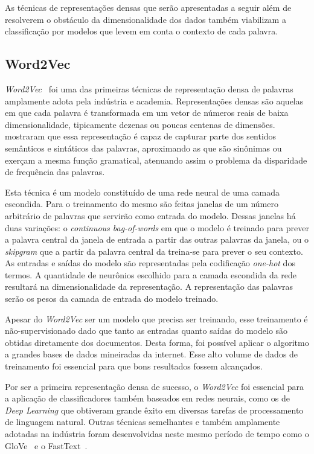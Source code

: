 
As técnicas de representações densas que serão apresentadas a seguir além de
resolverem o obstáculo da dimensionalidade dos dados também viabilizam a
classificação por modelos que levem em conta o contexto de cada palavra.

\subsection{Word2Vec}

\textit{Word2Vec}~\cite{mikolov13} foi uma das primeiras técnicas de
representação densa de palavras amplamente adota pela indústria e academia.
Representações densas são aquelas em que cada palavra é transformada em um vetor
de números reais de baixa dimensionalidade, tipicamente dezenas ou poucas
centenas de dimensões.
\citet{mikolov13} mostraram que essa representação é capaz de capturar parte dos
sentidos semânticos e sintáticos das palavras, aproximando as que são sinônimas
ou exerçam a mesma função gramatical, atenuando assim o problema da disparidade
de frequência das palavras.

Esta técnica é um modelo constituído de uma rede neural de uma camada escondida.
Para o treinamento do mesmo são feitas janelas de um número arbitrário de
palavras que servirão como entrada do modelo.
Dessas janelas há duas variações: o \textit{continuous bag-of-words} em que
o modelo é treinado para prever a palavra central da janela de entrada a partir
das outras palavras da janela, ou o \textit{skipgram} que a partir da palavra
central da treina-se para prever o seu contexto.
As entradas e saídas do modelo são representadas pela codificação
\textit{one-hot} dos termos.
A quantidade de neurônios escolhido para a camada escondida da rede resultará na
dimensionalidade da representação.
A representação das palavras serão os pesos da camada de entrada do modelo
treinado.


Apesar do \textit{Word2Vec} ser um modelo que precisa ser treinando, esse
treinamento é não-supervisionado dado que tanto as entradas quanto saídas do
modelo são obtidas diretamente dos documentos.
Desta forma, foi possível aplicar o algoritmo a grandes bases de dados
mineiradas da internet.
Esse alto volume de dados de treinamento foi essencial para que bons resultados
fossem alcançados.

Por ser a primeira representação densa de sucesso, o \textit{Word2Vec} foi
essencial para a aplicação de classificadores também baseados em redes neurais,
como os de \textit{Deep Learning} que obtiveram grande êxito em diversas
tarefas de processamento de linguagem natural.
Outras técnicas semelhantes e também amplamente adotadas na indústria foram
desenvolvidas neste mesmo período de tempo como o GloVe~\cite{pennington14} e
o FastText~\cite{bojanowski17}.

